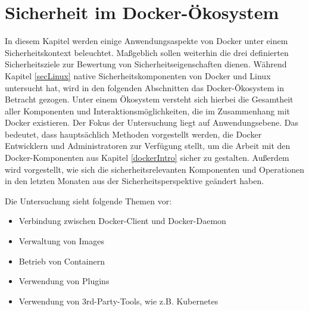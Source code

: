 \documentclass[../main.tex]{subfiles}
\begin{document}



\chapter{Sicherheit im Docker-Ökosystem}
\label{secEcosystem}
  In diesem Kapitel werden einige Anwendungsaspekte von Docker unter einem Sicherheitskontext beleuchtet. Maßgeblich sollen weiterhin die drei definierten Sicherheitsziele zur Bewertung von Sicherheitseigenschaften dienen. Während Kapitel \ref{secLinux} native Sicherheitskomponenten von Docker und Linux untersucht hat, wird in den folgenden Abschnitten das Docker-Ökosystem in Betracht gezogen. Unter einem Ökosystem versteht sich hierbei die Gesamtheit aller Komponenten und Interaktionsmöglichkeiten, die im Zusammenhang mit Docker existieren. Der Fokus der Untersuchung liegt auf Anwendungsebene. Das bedeutet, dass hauptsächlich Methoden vorgestellt werden, die Docker Entwicklern und Administratoren zur Verfügung stellt, um die Arbeit mit den Docker-Komponenten aus Kapitel \ref{dockerIntro} sicher zu gestalten. Außerdem wird vorgestellt, wie sich die sicherheitsrelevanten Komponenten und Operationen in den letzten Monaten aus der Sicherheitsperspektive geändert haben.


  Die Untersuchung sieht folgende Themen vor:

  \begin{itemize}
    \item Verbindung zwischen Docker-Client und Docker-Daemon
    \item Verwaltung von Images
    \item Betrieb von Containern
    \item Verwendung von Plugins
    \item Verwendung von 3rd-Party-Tools, wie z.B. Kubernetes
  \end{itemize}
\end{document}

